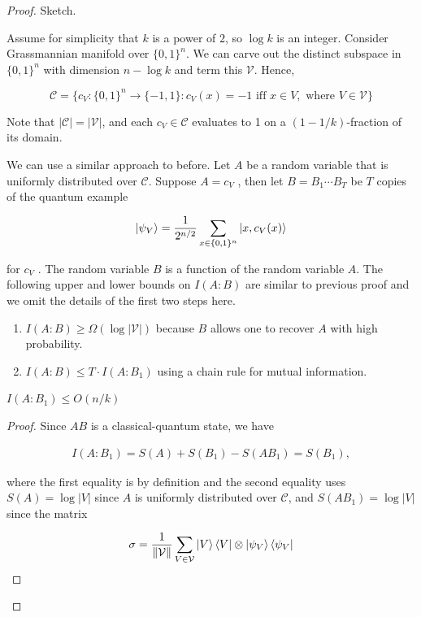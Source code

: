\documentclass[main.tex]{subfiles}
\begin{document}
\begin{proof}
Sketch.

Assume for simplicity that $k$ is a power of $2$, so $\log k$ is an integer. Consider Grassmannian manifold over $\{0, 1\}^n$. We can carve out the distinct subspace in $\{0, 1\}^n$ with dimension $n - \log k$ and term this $\mathcal{V}$. Hence,

$$
\mathcal{C}=\{c_V :\{0,1\}^n \rightarrow \{-1,1\}: c_V(x)= -1\text{ iff }x \in V,\text{ where }V \in \mathcal{V} \}
$$

Note that $|\mathcal{C}| = |\mathcal{V}|$, and each $c_V \in \mathcal{C}$ evaluates to 1 on a $(1-1/k)$-fraction of its domain.

We can use a similar approach to before. Let $A$ be a random variable that is uniformly distributed over $\mathcal{C}$. Suppose $A = c_V$ , then let $B = B_1 \cdots B_T$ be $T$ copies of the quantum example 

$$\ket{\psi_V} = \frac{1}{2^{n/2}}\sum_{x \in \{0,1\}^n} \ket{x, c_V(x)} $$

for $c_V$ . The random variable $B$ is a function of the random variable $A$. The following upper and lower bounds on $I(A : B)$ are similar to previous proof and we omit the details of the first two steps here. 
  
\begin{enumerate}
\item $I(A:B) \geq \Omega(\log|\mathcal{V}|)$ because $B$ allows one to recover $A$ with high probability.	
\item $I(A:B)\leq T\cdot I(A:B_1)$ using a chain rule for mutual information.
\end{enumerate}

\begin{lemma}
$I(A : B_1) \leq O(n/k)$	
\end{lemma}

\begin{proof} 
Since $AB$ is a classical-quantum state, we have

\begin{align*}
I(A : B_1) = S(A) + S(B_1) − S(AB_1) = S(B_1),	
\end{align*}

where the first equality is by definition and the second equality uses $S(A) = \log|V|$ since $A$ is uniformly distributed over $\mathcal{C}$, and $S(AB_1) = \log|V|$ since the matrix 

$$
\sigma = \frac{1}{\|\mathcal{V}\|}\sum_{V \in \mathcal{V}}\ket{V}\bra{V} \otimes \ket{\psi_V}\bra{\psi_V}
$$


\end{proof}
\end{proof}
\end{document}

